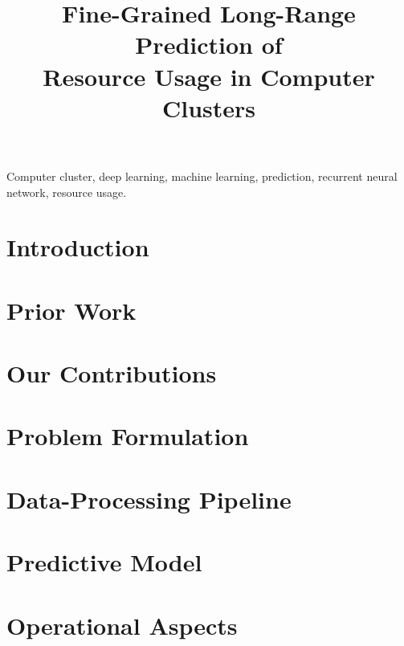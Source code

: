 \documentclass[journal]{IEEEtran}
\title{
  Fine-Grained Long-Range Prediction of\\
  Resource Usage in Computer Clusters
}
\author{}
\begin{document}
  \maketitle

  \begin{abstract}
    
  \end{abstract}

  \begin{IEEEkeywords}
    Computer cluster,
    deep learning,
    machine learning,
    prediction,
    recurrent neural network,
    resource usage.
  \end{IEEEkeywords}


  \section{Introduction} 
  

  \section{Prior Work} 
  

  \section{Our Contributions} 
  

  \section{Problem Formulation} 
  

  \section{Data-Processing Pipeline} 
  

  \section{Predictive Model} 
  

  \section{Operational Aspects} 
  
\end{document}
